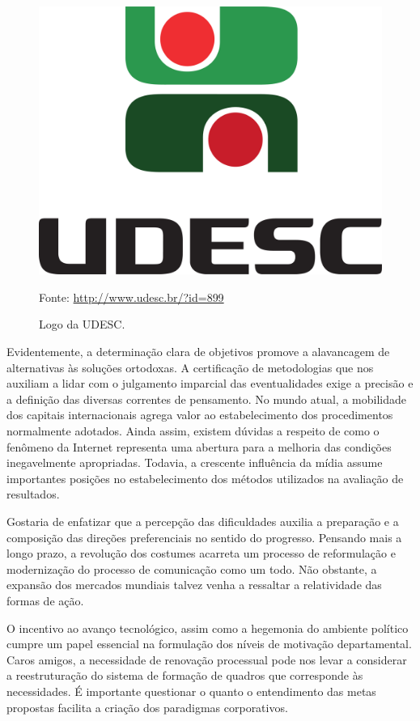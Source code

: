 \documentclass[a4paper,12pt]{udesc}
\begin{document}
\begin{figure}[h!]
\centering
\caption{Logo da UDESC.}

\includegraphics[scale=0.04]{fig/Marca_UDESC_vertical.pdf}


Fonte: \url{http://www.udesc.br/?id=899}


\end{figure}


          Evidentemente, a determinação clara de objetivos promove a alavancagem de alternativas às soluções ortodoxas. A certificação de metodologias que nos auxiliam a lidar com o julgamento imparcial das eventualidades exige a precisão e a definição das diversas correntes de pensamento. No mundo atual, a mobilidade dos capitais internacionais agrega valor ao estabelecimento dos procedimentos normalmente adotados. Ainda assim, existem dúvidas a respeito de como o fenômeno da Internet representa uma abertura para a melhoria das condições inegavelmente apropriadas. Todavia, a crescente influência da mídia assume importantes posições no estabelecimento dos métodos utilizados na avaliação de resultados. 

          Gostaria de enfatizar que a percepção das dificuldades auxilia a preparação e a composição das direções preferenciais no sentido do progresso. Pensando mais a longo prazo, a revolução dos costumes acarreta um processo de reformulação e modernização do processo de comunicação como um todo. Não obstante, a expansão dos mercados mundiais talvez venha a ressaltar a relatividade das formas de ação. 

          O incentivo ao avanço tecnológico, assim como a hegemonia do ambiente político cumpre um papel essencial na formulação dos níveis de motivação departamental. Caros amigos, a necessidade de renovação processual pode nos levar a considerar a reestruturação do sistema de formação de quadros que corresponde às necessidades. É importante questionar o quanto o entendimento das metas propostas facilita a criação dos paradigmas corporativos. 
\end{document}
